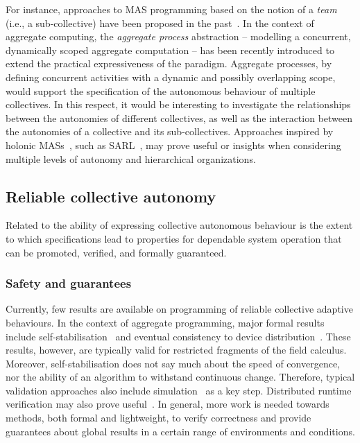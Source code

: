 For instance, approaches to MAS programming 
 based on the notion of a \emph{team} (i.e., a sub-collective)
 have been proposed in the past~\cite{DBLP:conf/atal/PynadathTCC99,DBLP:journals/jnca/JarvisRMJ06,DBLP:conf/mobiquitous/KoutsoubeliasL16}.
%
In the context of aggregate computing,
 the \emph{aggregate process} abstraction
 -- modelling a concurrent, dynamically scoped aggregate computation --
 has been recently introduced to extend the
 practical expressiveness of the paradigm.
%
Aggregate processes,
 by defining concurrent activities
 with a dynamic and possibly overlapping scope,
 would support
 the specification of the autonomous behaviour
 of multiple collectives.
%
In this respect,
 it would be interesting to investigate
 the relationships between the autonomies of different collectives,
 as well as the interaction between the autonomies
 of a collective and its sub-collectives.
%
Approaches inspired by holonic MASs~\cite{DBLP:series/ncs/RodriguezHGGK11},
 such as SARL~\cite{DBLP:conf/webi/RodriguezGG14},
 may prove useful or insights when considering multiple levels of autonomy and
 hierarchical organizations.
 

\subsection{Reliable collective autonomy}
\label{mdpi2020:gaps:reliability}

Related to the ability of expressing collective autonomous behaviour
 is the extent to which specifications lead to properties 
 for dependable system operation that can be 
 promoted, verified, and formally guaranteed.

\subsubsection{Safety and guarantees}

Currently, few results are available 
 on programming of reliable collective adaptive behaviours.
%
In the context of aggregate programming,
 major formal results 
 include self-stabilisation~\cite{DBLP:journals/tomacs/ViroliABDP18}
 and eventual consistency to device distribution~\cite{DBLP:journals/taas/BealVPD17}.
%
These results, however, are typically valid for restricted fragments of the field calculus.
%
Moreover, 
 self-stabilisation does not say much about
 the speed of convergence,
 nor the ability of an algorithm to withstand continuous change.
%
Therefore, 
 typical validation approaches also include
 simulation~\cite{mittal2017simulation-cas} as a key step.
%
Distributed runtime verification may also prove useful~\cite{audrito2021drv-slcs-fc}.
%
In general, more work is needed 
 towards methods, both formal and lightweight,
 to verify correctness and provide guarantees
 about global results in a certain range of environments
 and conditions.


